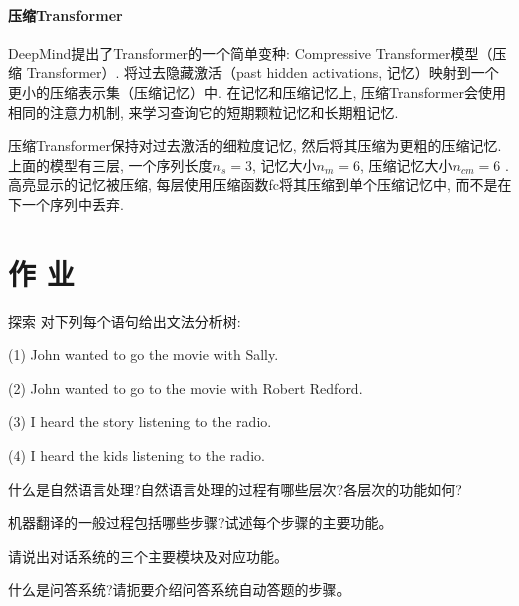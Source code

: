 \paragraph{压缩Transformer}

DeepMind提出了Transformer的一个简单变种:  Compressive Transformer模型（压缩 Transformer）.
将过去隐藏激活（past hidden activations, 记忆）映射到一个更小的压缩表示集（压缩记忆）中. 在记忆和压缩记忆上, 压缩Transformer会使用相同的注意力机制, 来学习查询它的短期颗粒记忆和长期粗记忆.

压缩Transformer保持对过去激活的细粒度记忆, 然后将其压缩为更粗的压缩记忆. 上面的模型有三层, 一个序列长度$n_s = 3$, 记忆大小$n_m = 6$, 压缩记忆大小$n_{cm} = 6$ \cite{raecompressive2019}. 高亮显示的记忆被压缩, 每层使用压缩函数fc将其压缩到单个压缩记忆中, 而不是在下一个序列中丢弃.
\section{作 业 }
\begin{custom}[explorecolor]{探索}
对下列每个语句给出文法分析树:

    (1)  John  wanted  to  go  the  movie  with  Sally.

    (2)  John  wanted  to  go  to  the  movie  with  Robert  Redford.

    (3)  I  heard  the  story  listening  to  the  radio.

    (4)  I  heard  the  kids  listening  to  the  radio.
\end{custom}

\begin{think}
    什么是自然语言处理?自然语言处理的过程有哪些层次?各层次的功能如何?
\end{think}

\begin{think}
    机器翻译的一般过程包括哪些步骤?试述每个步骤的主要功能。
\end{think}
\begin{think}
    请说出对话系统的三个主要模块及对应功能。
\end{think}

\begin{think}
    什么是问答系统?请扼要介绍问答系统自动答题的步骤。
\end{think}

